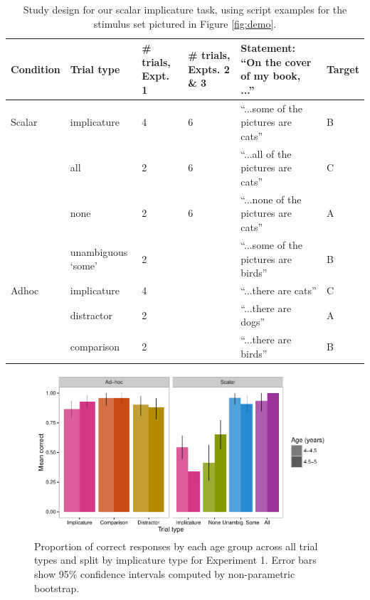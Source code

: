 \documentclass[man]{apa2}
\begin{document}
{\newpage

 \begin{table}
 \footnotesize
 \centering
     \begin{tabular}{C{1.5cm} C{2cm} C{1.5cm} C{1.5cm} C{4.5cm} C{1.5cm}}
                      \hline
       \null   Condition  & Trial type & \# trials, Expt. 1 & \# trials, Expts. 2 \& 3 & Statement: ``On the cover of my book, ...'' & Target   \\
       \hline
            Scalar & implicature & 4 & 6 &  ``...some of the pictures are cats'' & B	 \\
          & all  & 2 &  6 & ``...all of the pictures are cats'' & C		                 \\
           & none  & 2 & 6 & ``...none of the pictures are cats'' & A			\\
               & unambiguous `some' 	&  2 &  & ``...some of the pictures are birds'' & B					        \\
	\hline
	    Adhoc       & implicature & 4 &  & ``...there are cats'' & C 		\\
	     & distractor & 2 &  & ``...there are dogs'' & A	     \\
          & comparison & 2 &  & ``...there are birds'' & B 	   \\
       \hline
     \end{tabular}
     \caption{Study design for our scalar implicature task, using script examples for the stimulus set pictured in Figure \ref{fig:demo}. \label{tab:scripts} }
 \end{table}

\newpage

 \begin{figure}
 \begin{center}
  \includegraphics[width=6in]{figures/exp1_performance.pdf}
  \caption{\label{fig:exp1_perf} Proportion of correct responses by each age group across all trial types and split by implicature type for Experiment 1. Error bars show 95\% confidence intervals computed by non-parametric bootstrap.}
 \end{center}
\end{figure}

}
\end{document}
